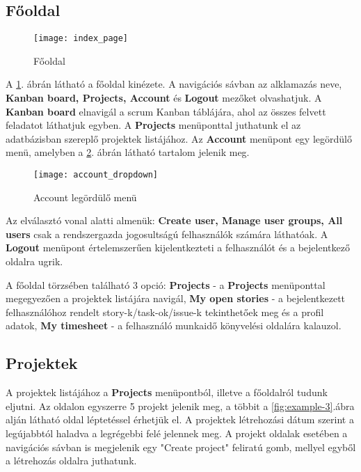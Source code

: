\subsection{Főoldal}

\begin{figure}[H]
	\centering
	\texttt{[image: index\_page]}
	\caption{Főoldal}
	\label{fig:example-1}
\end{figure}

A \ref{fig:example-1}. ábrán látható a főoldal kinézete. A navigációs sávban az alklamazás neve, \textbf{Kanban board, Projects, Account} és \textbf{Logout} mezőket olvashatjuk. A \textbf{Kanban board} elnavigál a scrum Kanban táblájára, ahol az összes felvett feladatot láthatjuk egyben. A \textbf{Projects} menüponttal juthatunk el az adatbázisban szereplő projektek listájához. Az \textbf{Account} menüpont egy legördülő menü, amelyben a \ref{fig:example-2}. ábrán látható tartalom jelenik meg.

\begin{figure}[H]
	\centering
	\texttt{[image: account\_dropdown]}
	\caption{Account legördülő menü}
	\label{fig:example-2}
\end{figure}

Az elválasztó vonal alatti almenük: \textbf{Create user,  Manage user groups, All users} csak a rendszergazda jogosultságú felhasználók számára láthatóak. A \textbf{Logout} menüpont értelemszerűen kijelentkezteti a felhasználót és a bejelentkező oldalra ugrik.

A főoldal törzsében található 3 opció: \textbf{Projects} - a \textbf{Projects} menüponttal megegyezően a projektek listájára navigál, \textbf{My open stories} - a bejelentkezett felhasználóhoz rendelt story-k/task-ok/issue-k tekinthetőek meg és a profil adatok, \textbf{My timesheet} - a felhasználó munkaidő könyvelési oldalára kalauzol.

\subsection{Projektek}
\label{projects}

A projektek listájához a \textbf{Projects} menüpontból, illetve a főoldalról tudunk eljutni. Az oldalon egyszerre 5 projekt jelenik meg, a többit a \ref{fig:example-3}.ábra alján látható oldal léptetéssel érhetjük el. A projektek létrehozási dátum szerint a legújabbtól haladva a legrégebbi felé jelennek meg. A projekt oldalak esetében a navigációs sávban is megjelenik egy "Create project" feliratú gomb, mellyel egyből a létrehozás oldalra juthatunk.

